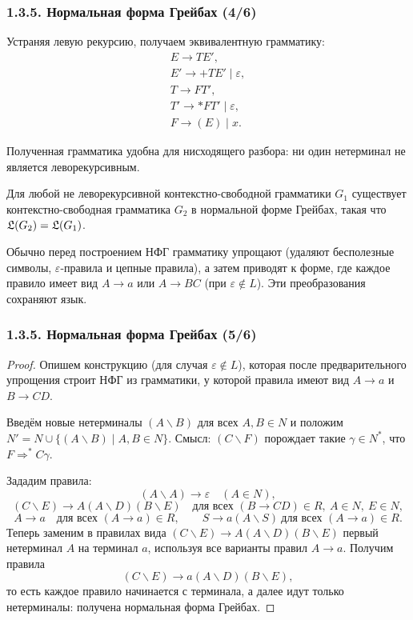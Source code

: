 \begin{frame}
\frametitle{1.3.5. Нормальная форма Грейбах (4/6)}

Устраняя левую рекурсию, получаем эквивалентную грамматику:
\[
\begin{array}{l}
E\to TE' ,\\
E'\to +TE'\mid \varepsilon,\\
T\to FT',\\
T'\to \ast FT'\mid \varepsilon,\\
F\to (E)\mid x.
\end{array}
\]


\begin{remark}
Полученная грамматика удобна для нисходящего разбора:
ни один нетерминал не является леворекурсивным.
\end{remark}

\begin{theorem}
Для любой не леворекурсивной контекстно-свободной грамматики $G_1$
существует контекстно-свободная грамматика $G_2$ в нормальной форме Грейбах,
такая что  $\frak{L}(G_2)=\frak{L}(G_1)$.
\end{theorem}

\begin{digress}
Обычно перед построением НФГ грамматику упрощают (удаляют бесполезные символы,
$\varepsilon$-правила и цепные правила), а затем приводят к форме,
где каждое правило имеет вид $A\to a$ или $A\to BC$ (при $\varepsilon\notin L$).
Эти преобразования сохраняют язык.
\end{digress}

\end{frame}


\begin{frame}
\frametitle{1.3.5. Нормальная форма Грейбах (5/6)}
\begin{proof}
Опишем конструкцию (для случая $\varepsilon\notin L$), которая после предварительного упрощения
строит НФГ из грамматики, у которой правила имеют вид $A\to a$ и $B\to CD$.

Введём новые нетерминалы $(A\backslash B)$ для всех $A,B\in N$ и положим
$N' = N \cup \{(A\backslash B)\mid A,B\in N\}$.
Смысл: $(C\backslash F)$ порождает такие $\gamma\in N^*$, что $F\Rightarrow^* C\gamma$.

Зададим правила:
\[
(A\backslash A)\to \varepsilon\quad (A\in N),
\]
\[
(C\backslash E)\to A(A\backslash D)(B\backslash E)
\quad \text{для всех }(B\to CD)\in R,\ A\in N,\ E\in N,
\]
\[
A\to a \quad \text{для всех }(A\to a)\in R,
\qquad
S\to a(A\backslash S)\ \text{для всех }(A\to a)\in R.
\]
Теперь заменим в правилах вида $(C\backslash E)\to A(A\backslash D)(B\backslash E)$
первый нетерминал $A$ на терминал $a$, используя все варианты правил $A\to a$.
Получим правила
\[
(C\backslash E)\to a(A\backslash D)(B\backslash E),
\]
то есть каждое правило начинается с терминала, а далее идут только нетерминалы:
получена нормальная форма Грейбах.



\end{proof}
\end{frame}


